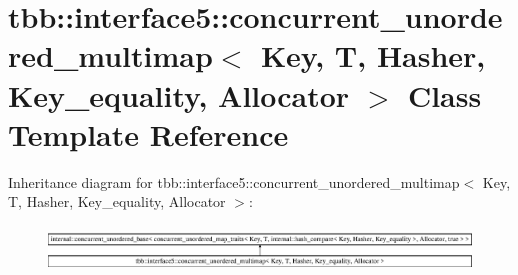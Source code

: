 \hypertarget{classtbb_1_1interface5_1_1concurrent__unordered__multimap}{}\section{tbb\+:\+:interface5\+:\+:concurrent\+\_\+unordered\+\_\+multimap$<$ Key, T, Hasher, Key\+\_\+equality, Allocator $>$ Class Template Reference}
\label{classtbb_1_1interface5_1_1concurrent__unordered__multimap}
Inheritance diagram for tbb\+:\+:interface5\+:\+:concurrent\+\_\+unordered\+\_\+multimap$<$ Key, T, Hasher, Key\+\_\+equality, Allocator $>$\+:\begin{figure}[H]
\begin{center}
\leavevmode
\includegraphics[height=1.222707cm]{classtbb_1_1interface5_1_1concurrent__unordered__multimap}
\end{center}
\end{figure}
